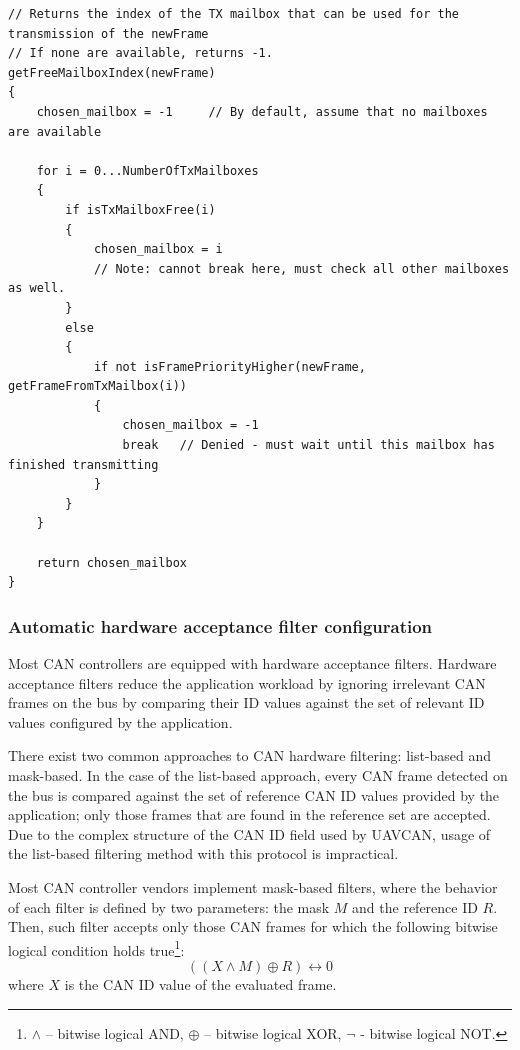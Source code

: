 \begin{minipage}{0.8\textwidth}
\begin{verbatim}
// Returns the index of the TX mailbox that can be used for the transmission of the newFrame
// If none are available, returns -1.
getFreeMailboxIndex(newFrame)
{
    chosen_mailbox = -1     // By default, assume that no mailboxes are available

    for i = 0...NumberOfTxMailboxes
    {
        if isTxMailboxFree(i)
        {
            chosen_mailbox = i
            // Note: cannot break here, must check all other mailboxes as well.
        }
        else
        {
            if not isFramePriorityHigher(newFrame, getFrameFromTxMailbox(i))
            {
                chosen_mailbox = -1
                break   // Denied - must wait until this mailbox has finished transmitting
            }
        }
    }

    return chosen_mailbox
}
\end{verbatim}
\end{minipage}

\subsubsection{Automatic hardware acceptance filter configuration}

Most CAN controllers are equipped with hardware acceptance filters.
Hardware acceptance filters reduce the application workload by ignoring irrelevant CAN frames on the bus
by comparing their ID values against the set of relevant ID values configured by the application.

There exist two common approaches to CAN hardware filtering:
list-based and mask-based.
In the case of the list-based approach, every CAN frame detected on the bus is compared
against the set of reference CAN ID values provided by the application;
only those frames that are found in the reference set are accepted.
Due to the complex structure of the CAN ID field used by UAVCAN,
usage of the list-based filtering method with this protocol is impractical.

Most CAN controller vendors implement mask-based filters,
where the behavior of each filter is defined by two parameters: the mask $M$ and the reference ID $R$.
Then, such filter accepts only those CAN frames for which the following bitwise logical condition holds
true\footnote{$\land$ -- bitwise logical AND, $\oplus$ -- bitwise logical XOR, $\neg$ - bitwise logical NOT.}:
$$((X \land M) \oplus R) \leftrightarrow 0$$
where $X$ is the CAN ID value of the evaluated frame.

